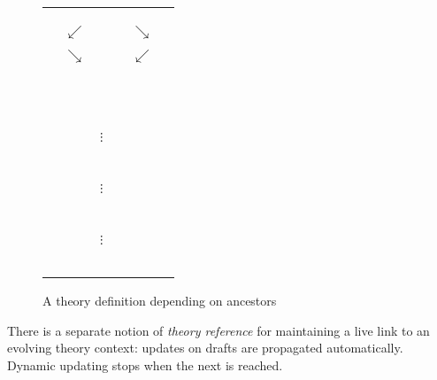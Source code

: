 \begin{isabellebody}
\begin{isamarkuptext}
  \begin{figure}[htb]
  \begin{center}
  \begin{tabular}{rcccl}
        &            & \isa{Pure} \\
        &            & \isa{{\isasymdown}} \\
        &            & \isa{FOL} \\
        & $\swarrow$ &              & $\searrow$ & \\
  \isa{Nat} &    &              &            & \isa{List} \\
        & $\searrow$ &              & $\swarrow$ \\
        &            & \isa{Length} \\
        &            & \multicolumn{3}{l}{~~\hyperlink{keyword.imports}{\mbox{\isa{\isakeyword{imports}}}}} \\
        &            & \multicolumn{3}{l}{~~\hyperlink{keyword.begin}{\mbox{\isa{\isakeyword{begin}}}}} \\
        &            & $\vdots$~~ \\
        &            & \isa{{\isasymbullet}}~~ \\
        &            & $\vdots$~~ \\
        &            & \isa{{\isasymbullet}}~~ \\
        &            & $\vdots$~~ \\
        &            & \multicolumn{3}{l}{~~\hyperlink{command.end}{\mbox{\isa{\isacommand{end}}}}} \\
  \end{tabular}
  \caption{A theory definition depending on ancestors}\label{fig:ex-theory}
  \end{center}
  \end{figure}

  \medskip There is a separate notion of \emph{theory reference} for
  maintaining a live link to an evolving theory context: updates on
  drafts are propagated automatically.  Dynamic updating stops when
  the next  is reached.


\end{isamarkuptext}
\end{isabellebody}
